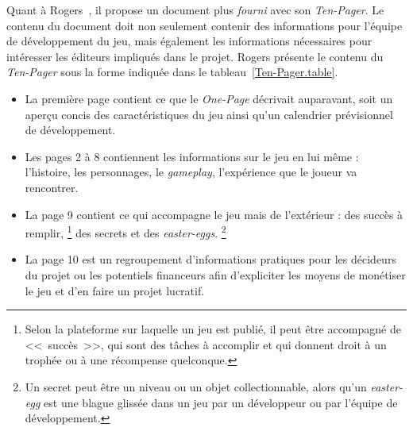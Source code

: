 



Quant \`a Rogers~\cite{LevelUpRogers2014}, il  propose un document plus \emph{fourni} avec son \emph{Ten-Pager}.
Le contenu du document doit non seulement contenir des informations pour l'équipe de développement du jeu, mais également les informations nécessaires pour int\'eresser les éditeurs impliqués dans le projet.
Rogers présente le contenu du \emph{Ten-Pager} sous la forme indiqu\'ee dans le tableau~\ref{Ten-Pager.table}.


\begin{itemize}

\item La première page contient ce que le \emph{One-Page} décrivait auparavant, soit un aperçu concis des caractéristiques du jeu ainsi qu'un calendrier prévisionnel de d\'eveloppement.

\item Les pages 2 à 8 contiennent les informations sur le jeu en lui même : l'histoire, les personnages, le \emph{gameplay}, l'expérience que le joueur va rencontrer.

\item La page 9 contient ce qui accompagne le jeu mais de l'extérieur : des succès à remplir, \footnote{Selon la plateforme sur laquelle un jeu est publié, il peut être accompagné de <<~succès~>>, qui sont des tâches à accomplir et qui donnent droit à un trophée ou \`a une récompense quelconque.} des secrets et des \emph{easter-eggs}.%
%
\footnote{Un secret peut être un niveau ou un objet collectionnable, alors qu'un \emph{easter-egg} est une blague glissée dans un jeu par un développeur ou par l'équipe de développement.}


\item La page 10 est un regroupement d'informations pratiques pour les décideurs du projet ou les potentiels financeurs afin d'expliciter les moyens de monétiser le jeu et d'en faire un projet lucratif.

\end{itemize}
    
